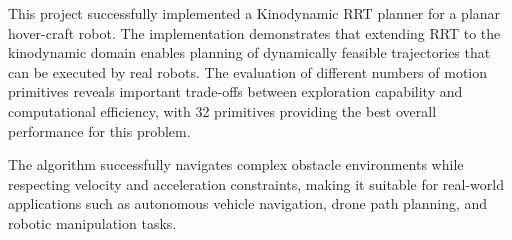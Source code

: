 \documentclass[11pt]{article}
\begin{document}
This project successfully implemented a Kinodynamic RRT planner for a planar hover-craft robot. The implementation demonstrates that extending RRT to the kinodynamic domain enables planning of dynamically feasible trajectories that can be executed by real robots. The evaluation of different numbers of motion primitives reveals important trade-offs between exploration capability and computational efficiency, with 32 primitives providing the best overall performance for this problem.

The algorithm successfully navigates complex obstacle environments while respecting velocity and acceleration constraints, making it suitable for real-world applications such as autonomous vehicle navigation, drone path planning, and robotic manipulation tasks.
\end{document}
